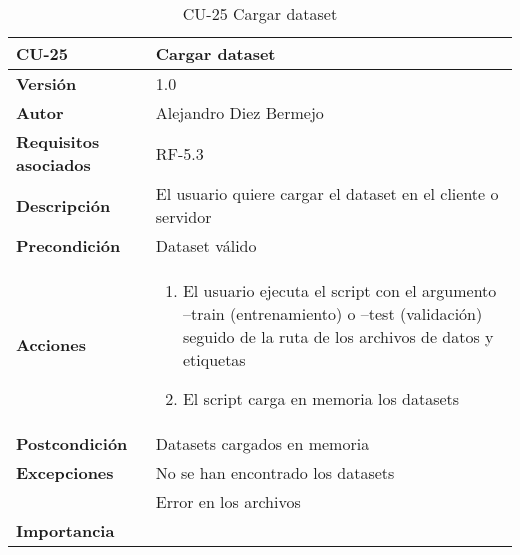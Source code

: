 \begin{table}[p]
	\centering
	\begin{tabularx}{\linewidth}{ p{} p{} }
		\toprule
		\textbf{CU-25}    & \textbf{Cargar dataset}\\
		\toprule
		\textbf{Versión}              & 1.0    \\
		\textbf{Autor}                & Alejandro Diez Bermejo \\
		\textbf{Requisitos asociados} & RF-5.3 \\
		\textbf{Descripción}          & El usuario quiere cargar el dataset en el cliente o servidor \\
        \textbf{Precondición}         & Dataset válido \\
		\textbf{Acciones}             &
		\begin{enumerate}
			\def\labelenumi{\arabic{enumi}.}
			\tightlist
            \item El usuario ejecuta el script con el argumento --train (entrenamiento) o --test (validación) seguido de la ruta de los archivos de datos y etiquetas
            \item El script carga en memoria los datasets
		\end{enumerate}\\
		\textbf{Postcondición}        & Datasets cargados en memoria \\
		\textbf{Excepciones}          & No se han encontrado los datasets \\
                                      & Error en los archivos \\
		\textbf{Importancia}          &  \\
		\bottomrule
	\end{tabularx}
	\caption{CU-25 Cargar dataset}
\end{table}

